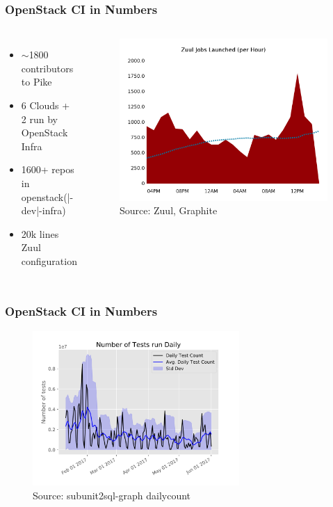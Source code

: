\documentclass[aspectratio=169,11pt,hyperref={colorlinks=true}]{beamer}
\begin{document}
\begin{frame}
    \frametitle{OpenStack CI in Numbers}
       \begin{columns}
    \begin{itemize}
        \item{$\sim$1800 contributors to Pike}
        \item{6 Clouds + 2 run by OpenStack Infra}
        \item{1600+ repos in openstack(|-dev|-infra)}
        \item{20k lines Zuul configuration}
    \end{itemize}
    \begin{figure}
    \begin{center}
    	\includegraphics[width=1\textwidth]{zuul_all_jobs.png}
         \caption{Source: Zuul, Graphite}
    \end{center}
    \end{figure}
       \end{columns}
\end{frame}

\begin{frame}
    \frametitle{OpenStack CI in Numbers}
    \begin{figure}
    \begin{center}
    	\includegraphics[width=0.7\textwidth]{daily_count.png}
         \caption{Source: subunit2sql-graph dailycount}
    \end{center}
    \end{figure}
\end{frame}
\end{document}
